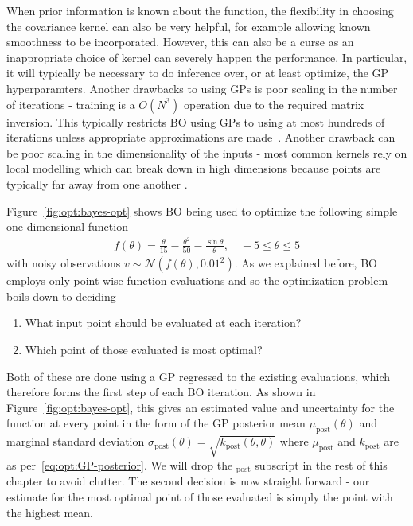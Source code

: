When prior information is known about the function, the
flexibility in choosing the covariance kernel can also be very helpful, for example allowing known
smoothness to be incorporated.  However, this can also be a curse as an inappropriate choice of
kernel can severely happen the performance.  In particular, it will typically be necessary to
do inference over, or at least optimize, the GP hyperparamters.  Another drawbacks to using GPs
is poor scaling in the number of iterations - training is a $O(N^3)$ operation due to the required
matrix inversion.  This typically restricts BO using GPs to using at most hundreds of iterations
unless appropriate approximations are made~\citep{snelson2006sparse,hensman2013gaussian}.
Another drawback can be poor scaling in the dimensionality of the inputs - most common kernels
rely on local modelling which can break down in high dimensions because points are typically
far away from one another \citep{bengio2006curse}.  

Figure~\ref{fig:opt:bayes-opt} shows BO being used to optimize the 
following simple one dimensional function
\begin{align}
\label{eq:opt:toy}
f(\theta) = \frac{\theta}{15}-\frac{\theta^2}{50}-\frac{\sin \theta}{\theta}, \quad -5\le \theta \le 5
\end{align}
with noisy observations $v\sim\mathcal{N}(f(\theta),0.01^2)$.  As we
explained before, BO employs only point-wise function
evaluations and so the optimization problem boils down to deciding 
\begin{enumerate}
	\item What input point should be evaluated at each iteration?
	\item Which point of those evaluated is most optimal?
\end{enumerate}
Both of these are done using a GP regressed to the existing evaluations,
which therefore forms the first step of each BO iteration.  As shown in
Figure~\ref{fig:opt:bayes-opt}, this gives an estimated value and uncertainty for the function
at every point in the form of the GP posterior mean $\mu_{\text{post}}(\theta)$ and 
marginal standard deviation $\sigma_{\text{post}}(\theta) = \sqrt{k_{\text{post}}(\theta,\theta)}$
where $\mu_{\text{post}}$ and $k_{\text{post}}$ are as per~\eqref{eq:opt:GP-posterior}.  We will
drop the $_{\text{post}}$ subscript in the rest of this chapter to avoid clutter.
The second decision is now straight forward - our
estimate for the most optimal point of those evaluated is simply the point with
the highest mean.  

